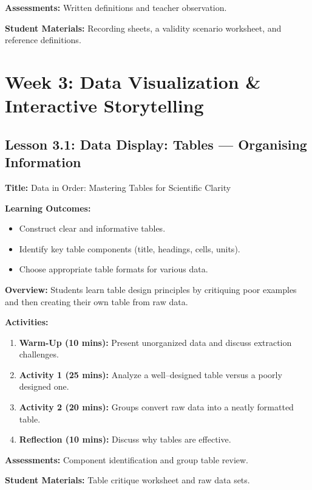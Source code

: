 \documentclass{tufte-book}
\begin{document}
\medskip
\textbf{Assessments:}  
Written definitions and teacher observation.

\medskip
\textbf{Student Materials:}  
Recording sheets, a validity scenario worksheet, and reference definitions.

\section{Week 3: Data Visualization \& Interactive Storytelling}

\subsection{Lesson 3.1: Data Display: Tables --- Organising Information}
\textbf{Title:} Data in Order: Mastering Tables for Scientific Clarity

\medskip
\textbf{Learning Outcomes:}
\begin{itemize}[leftmargin=*, label={\textbullet}]
    \item Construct clear and informative tables.
    \item Identify key table components (title, headings, cells, units).
    \item Choose appropriate table formats for various data.
\end{itemize}

\medskip
\textbf{Overview:}  
Students learn table design principles by critiquing poor examples and then creating their own table from raw data.

\medskip
\textbf{Activities:}
\begin{enumerate}[label=\arabic*.]
    \item \textbf{Warm-Up (10 mins):} Present unorganized data and discuss extraction challenges.
    \item \textbf{Activity 1 (25 mins):} Analyze a well--designed table versus a poorly designed one.
    \item \textbf{Activity 2 (20 mins):} Groups convert raw data into a neatly formatted table.
    \item \textbf{Reflection (10 mins):} Discuss why tables are effective.
\end{enumerate}

\medskip
\textbf{Assessments:}  
Component identification and group table review.

\medskip
\textbf{Student Materials:}  
Table critique worksheet and raw data sets.
\end{document}

